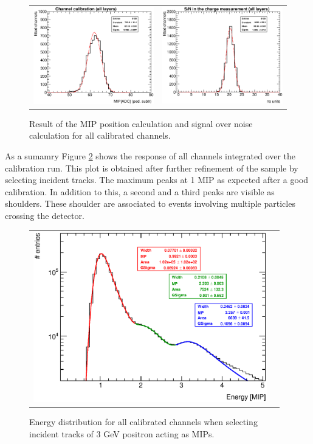 \documentclass[a4paper,11pt]{article}
\begin{document}
\begin{figure}[!t]
  \centering
  \begin{tabular}{ll}
      \includegraphics[width=2.8in]{../figs/MIP/MIPsummary_title.eps} & \includegraphics[width=2.8in]{../figs/MIP/SNsummary_title.eps}  
  \end{tabular}
\caption{Result of the MIP position calculation and signal over noise calculation for all calibrated channels.}
\label{mipandSN}
\end{figure}

As a sumamry Figure \ref{mip3peaks} shows the response of all channels integrated over the calibration run.
This plot is obtained after further refinement of the sample by selecting incident tracks.
The maximum peaks at 1 MIP as expected after a good calibration.
In addition to this, a second and a third peaks
are visible as shoulders. These shoulder are associated to 
events involving multiple 
particles crossing the detector.

\begin{figure}[!t]
  \centering 
    \begin{tabular}{ll}
      \includegraphics[width=4in]{../figs/MIP/MIP3peaks.eps} 
    \end{tabular}
    \caption{Energy distribution for all calibrated channels when selecting incident tracks of 3 GeV positron acting as MIPs.}
\label{mip3peaks}
\end{figure}
\end{document}
